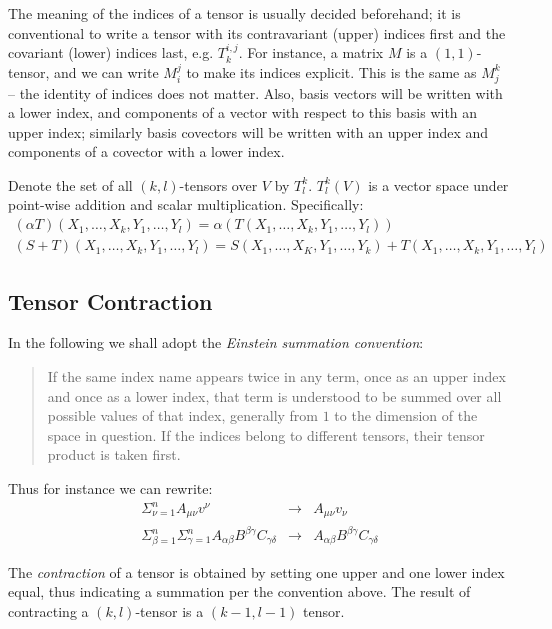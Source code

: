 The meaning of the indices of a tensor is usually decided beforehand; it is conventional to write a tensor with its contravariant (upper) indices first and the covariant (lower) indices last, e.g.{} \(T^{i,j}_k\). For instance, a matrix \(M\) is a \((1,1)\)-tensor, and we can write \(M_i^j\) to make its indices explicit. This is the same as \(M_j^k\) -- the identity of indices does not matter. Also, basis vectors will be written with a lower index, and components of a vector with respect to this basis with an upper index; similarly basis covectors will be written with an upper index and components of a covector with a lower index. 

Denote the set of all \((k,l)\)-tensors over \(V\) by \(T^k_l\).
$T^k_l(V)$ is a vector space under point-wise addition and scalar multiplication. Specifically:
\[
\begin{array}{l}
  (\alpha T)(X_1, \ldots, X_k, Y_1, \ldots, Y_l) = \alpha(T(X_1, \ldots, X_k, Y_1, \ldots, Y_l))\\
  (S+T)(X_1, \ldots, X_k, Y_1, \ldots, Y_l)=S(X_1, \ldots, X_K, Y_1, \ldots, Y_k) + T(X_1, \ldots, X_k, Y_1, \ldots, Y_l)
\end{array}
\]



\subsection{Tensor Contraction}\label{sec:summation-convention}
In the following we shall adopt the {\em Einstein summation convention}:
\begin{quotation}
  If the same index name appears twice in any term, once as an upper index and once as a lower index, that term is understood to be summed over all possible values of that index, generally from \(1\) to the dimension of the space in question. If the indices belong to different tensors, their tensor product is taken first.
\end{quotation}
Thus for instance we can rewrite:
\[
\begin{array}{lcl}
  \Sigma_{\nu=1}^n A_{\mu\nu}v^{\nu} & \rightarrow &   A_{\mu\nu}v_{\nu}\\
  \Sigma_{\beta=1}^n \Sigma_{\gamma=1}^n A _{\alpha \beta}B^{\beta \gamma}C_{\gamma \delta} & \rightarrow & A_{\alpha \beta}B^{\beta \gamma}C_{\gamma \delta}
\end{array}
\]

The {\em contraction} of a tensor is obtained by setting one upper and one lower index equal, thus indicating a summation per the convention above. The result of contracting a \((k,l)\)-tensor  is a \((k-1,l-1)\) tensor.

